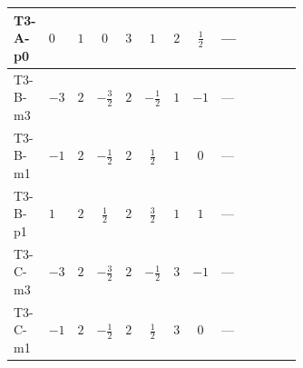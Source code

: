 \documentclass[8pt]{article}
\begin{document}
\begin{landscape}
\begin{longtable}{@{}llcccccc >{\raggedright\arraybackslash}p{0.21\linewidth} >{\raggedright\arraybackslash}p{0.21\linewidth} >{\raggedright\arraybackslash}p{0.21\linewidth}@{}}
\midrule
T3-A-p0 & $0$ & $1$ & $0$ & $3$ & $1$ & $2$ & $\frac{1}{2}$ & --- & \scriptsize\adjustbox{max width=\linewidth}{$\begin{gathered} +6 {\lambda_{12}^{(1)}}^2\end{gathered}$} & \scriptsize\adjustbox{max width=\linewidth}{$\begin{gathered} +4 {\lambda_{HS_1}^{(1)}}^2\end{gathered}$} \\
\midrule
T3-B-m3 & $-3$ & $2$ & $-\frac{3}{2}$ & $2$ & $-\frac{1}{2}$ & $1$ & $-1$ & --- & \scriptsize\adjustbox{max width=\linewidth}{$\begin{gathered} +4 {\lambda_{12}^{(1)}}^2\end{gathered}$} & \scriptsize\adjustbox{max width=\linewidth}{$\begin{gathered} +4 {\lambda_{HS_1}^{(1)}}^2\end{gathered}$} \\
\midrule
T3-B-m1 & $-1$ & $2$ & $-\frac{1}{2}$ & $2$ & $\frac{1}{2}$ & $1$ & $0$ & --- & \scriptsize\adjustbox{max width=\linewidth}{$\begin{gathered} +4 {\lambda_{12}^{(1)}}^2\end{gathered}$} & \scriptsize\adjustbox{max width=\linewidth}{$\begin{gathered} +4 {\lambda_{HS_1}^{(1)}}^2\end{gathered}$} \\
\midrule
T3-B-p1 & $1$ & $2$ & $\frac{1}{2}$ & $2$ & $\frac{3}{2}$ & $1$ & $1$ & --- & \scriptsize\adjustbox{max width=\linewidth}{$\begin{gathered} +4 {\lambda_{12}^{(1)}}^2\end{gathered}$} & \scriptsize\adjustbox{max width=\linewidth}{$\begin{gathered} +4 {\lambda_{HS_1}^{(1)}}^2\end{gathered}$} \\
\midrule
T3-C-m3 & $-3$ & $2$ & $-\frac{3}{2}$ & $2$ & $-\frac{1}{2}$ & $3$ & $-1$ & --- & \scriptsize\adjustbox{max width=\linewidth}{$\begin{gathered} +4 {\lambda_{12}^{(1)}}^2\end{gathered}$} & \scriptsize\adjustbox{max width=\linewidth}{$\begin{gathered} +4 {\lambda_{HS_1}^{(1)}}^2\end{gathered}$} \\
\midrule
T3-C-m1 & $-1$ & $2$ & $-\frac{1}{2}$ & $2$ & $\frac{1}{2}$ & $3$ & $0$ & --- & \scriptsize\adjustbox{max width=\linewidth}{$\begin{gathered} +4 {\lambda_{12}^{(1)}}^2\end{gathered}$} & \scriptsize\adjustbox{max width=\linewidth}{$\begin{gathered} +4 {\lambda_{HS_1}^{(1)}}^2\end{gathered}$} \\

\end{longtable}
\end{landscape}
\end{document}
